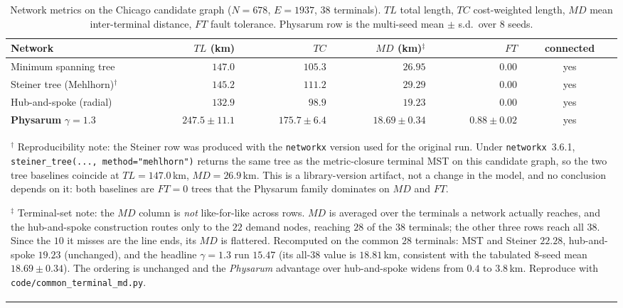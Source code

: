 \documentclass[11pt]{article}
\begin{document}
\begin{table}[t]
\centering
\caption{Network metrics on the Chicago candidate graph ($N=678$, $E=1937$, $38$ terminals).
$TL$ total length, $TC$ cost-weighted length, $MD$ mean inter-terminal distance, $FT$ fault
tolerance. Physarum row is the multi-seed mean $\pm$ s.d.\ over 8 seeds.}
\label{tab:metrics}
\begin{tabular}{lrrrrc}
\toprule
Network & $TL$ (km) & $TC$ & $MD$ (km)$^{\ddagger}$ & $FT$ & connected \\
\midrule
Minimum spanning tree   & $147.0$ & $105.3$ & $26.95$ & $0.00$ & yes \\
Steiner tree (Mehlhorn)$^{\dagger}$ & $145.2$ & $111.2$ & $29.29$ & $0.00$ & yes \\
Hub-and-spoke (radial)  & $132.9$ & $\phantom{0}98.9$ & $19.23$ & $0.00$ & yes \\
\textbf{Physarum} $\gamma{=}1.3$ & $247.5\pm11.1$ & $175.7\pm6.4$ & $18.69\pm0.34$ & $0.88\pm0.02$ & yes \\
\bottomrule
\multicolumn{6}{p{0.95\linewidth}}{\footnotesize $^{\dagger}$ Reproducibility note: the
Steiner row was produced with the \texttt{networkx} version used for the original run.
Under \texttt{networkx}~3.6.1, \texttt{steiner\_tree(..., method="mehlhorn")} returns the
same tree as the metric-closure terminal MST on this candidate graph, so the two tree
baselines coincide at $TL=147.0$\,km, $MD=26.9$\,km. This is a library-version artifact,
not a change in the model, and no conclusion depends on it: both baselines are $FT=0$
trees that the Physarum family dominates on $MD$ and $FT$.\par\vspace{2pt}
$^{\ddagger}$ Terminal-set note: the $MD$ column is \emph{not} like-for-like across rows.
$MD$ is averaged over the terminals a network actually reaches, and the hub-and-spoke
construction routes only to the $22$ demand nodes, reaching $28$ of the $38$ terminals; the
other three rows reach all $38$. Since the $10$ it misses are the line ends, its $MD$ is
flattered. Recomputed on the common $28$ terminals: MST and Steiner $22.28$, hub-and-spoke
$19.23$ (unchanged), and the headline $\gamma{=}1.3$ run $15.47$ (its all-$38$ value is
$18.81$\,km, consistent with the tabulated $8$-seed mean $18.69\pm0.34$). The ordering is
unchanged and the \emph{Physarum} advantage over hub-and-spoke widens from $0.4$ to
$3.8$\,km. Reproduce with \texttt{code/common\_terminal\_md.py}.}\\
\end{tabular}
\end{table}
\end{document}
